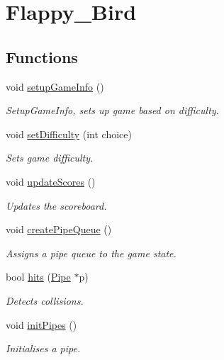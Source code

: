 \hypertarget{group___flappy___bird}{}\section{Flappy\+\_\+\+Bird}
\label{group___flappy___bird}
\subsection*{Functions}
\begin{DoxyCompactItemize}
\item 
void \hyperlink{group___flappy___bird_ga4b5a711a6b4b72b301a69dc3d5fd43ac}{setup\+Game\+Info} ()
\begin{DoxyCompactList}\small\item\em Setup\+Game\+Info, sets up game based on difficulty. \end{DoxyCompactList}\item 
void \hyperlink{group___flappy___bird_ga4a1fc7e6be8da601d6c09b6bd54b2130}{set\+Difficulty} (int choice)
\begin{DoxyCompactList}\small\item\em Sets game difficulty. \end{DoxyCompactList}\item 
void \hyperlink{group___flappy___bird_gae103b6fea2d41881b821fff74047d2ac}{update\+Scores} ()
\begin{DoxyCompactList}\small\item\em Updates the scoreboard. \end{DoxyCompactList}\item 
void \hyperlink{group___flappy___bird_ga94e07f51239dbd78a020cf0cef7ac605}{create\+Pipe\+Queue} ()
\begin{DoxyCompactList}\small\item\em Assigns a pipe queue to the game state. \end{DoxyCompactList}\item 
bool \hyperlink{group___flappy___bird_gacd19dd68085054a6f6fdf8b4ac664255}{hits} (\hyperlink{struct_pipe}{Pipe} $\ast$p)
\begin{DoxyCompactList}\small\item\em Detects collisions. \end{DoxyCompactList}\item 
void \hyperlink{group___flappy___bird_ga1e02da6e4d86847797f3b06dd1f6e76c}{init\+Pipes} ()
\begin{DoxyCompactList}\small\item\em Initialises a pipe. \end{DoxyCompactList}\item 

\end{DoxyCompactItemize}
